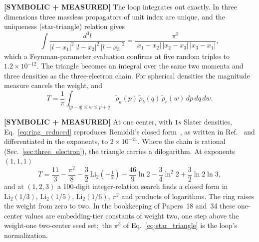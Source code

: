 \documentclass[aps,pra,twocolumn,superscriptaddress,longbibliography]{revtex4-2}
\begin{document}
\textbf{[SYMBOLIC + MEASURED]} The loop integrates out exactly.  In three
dimensions three massless propagators of unit index are unique, and the
uniqueness (star-triangle) relation gives
\begin{equation}
  \int\frac{d^3l}{|l-x_1|^2\,|l-x_2|^2\,|l-x_3|^2}
  = \frac{\pi^3}{|x_1-x_2|\,|x_2-x_3|\,|x_3-x_1|},
  \label{eq:star_triangle}
\end{equation}
which a Feynman-parameter evaluation confirms at five random triples to
$1.2\times10^{-12}$.  The triangle becomes an integral over the same two momenta and
three densities as the three-electron chain.  For spherical densities the
magnitude measure cancels the weight, and
\begin{equation}
  T = \frac{1}{\pi}\int_{|p-q|\le w\le p+q}
      \tilde\rho_a(p)\,\tilde\rho_b(q)\,\tilde\rho_c(w)\,dp\,dq\,dw .
  \label{eq:ring_reduced}
\end{equation}

\textbf{[SYMBOLIC + MEASURED]} At one center, with $1s$ Slater densities,
Eq.~\eqref{eq:ring_reduced} reproduces Remiddi's closed
form~\cite{remiddi1991}, as written in Ref.~\cite{ppr2004} and
differentiated in the exponents, to $2\times10^{-21}$.  Where the chain is
rational (Sec.~\ref{sec:three_electron}), the triangle carries a
dilogarithm.  At exponents $(1,1,1)$
\begin{equation}
  T = \frac{11}{3}-\frac{\pi^2}{8}-\frac32\,\mathrm{Li}_2\!\left(-\tfrac12\right)
      -\frac{46}{9}\ln 2-\frac34\ln^2 2+\frac32\ln 2\ln 3 ,
  \label{eq:ring_one_center}
\end{equation}
and at $(1,2,3)$ a 100-digit integer-relation search finds a closed form in
$\mathrm{Li}_2(1/3)$, $\mathrm{Li}_2(1/5)$, $\mathrm{Li}_2(1/6)$, $\pi^2$
and products of logarithms.  The ring raises the weight from zero to two.
In the bookkeeping of Papers~18 and~34 these one-center values are
embedding-tier constants of weight two, one step above the weight-one
two-center seed set;\ the $\pi^3$ of Eq.~\eqref{eq:star_triangle} is the
loop's normalization.
\end{document}
